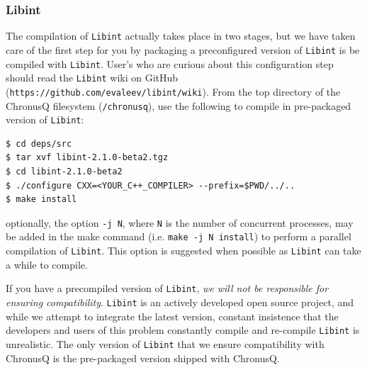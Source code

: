 \documentclass[12pt]{article}
\begin{document}
\subsubsection{Libint} \label{subsubsec:libintcomp}
The compilation of \texttt{Libint} actually takes place in two stages, but we have taken care of the first step for you by packaging a preconfigured version of \texttt{Libint} is be compiled with \texttt{Libint}. User's who are curious about this configuration step should read the \texttt{Libint} wiki on GitHub (\texttt{https://github.com/evaleev/libint/wiki}). From the top directory of the ChronusQ filesystem (\texttt{/chronusq}), use the following to compile in pre-packaged version of \texttt{Libint}:
\begin{lstlisting}
$ cd deps/src
$ tar xvf libint-2.1.0-beta2.tgz
$ cd libint-2.1.0-beta2
$ ./configure CXX=<YOUR_C++_COMPILER> --prefix=$PWD/../..
$ make install
\end{lstlisting}
optionally, the option \texttt{-j N}, where \texttt{N} is the number of concurrent processes, may be added in the make command (i.e. \texttt{make -j N install}) to perform a parallel compilation of \texttt{Libint}. This option is suggested when possible as \texttt{Libint} can take a while to compile.

If you have a precompiled version of \texttt{Libint}, \emph{we will not be responsible for ensuring compatibility}. \texttt{Libint} is an actively developed open source project, and while we attempt to integrate the latest version, constant insistence that the developers and users of this problem constantly compile and re-compile \texttt{Libint} is unrealistic. The only version of \texttt{Libint} that we ensure compatibility with ChronusQ is the pre-packaged version shipped with ChronusQ. 
\end{document}
